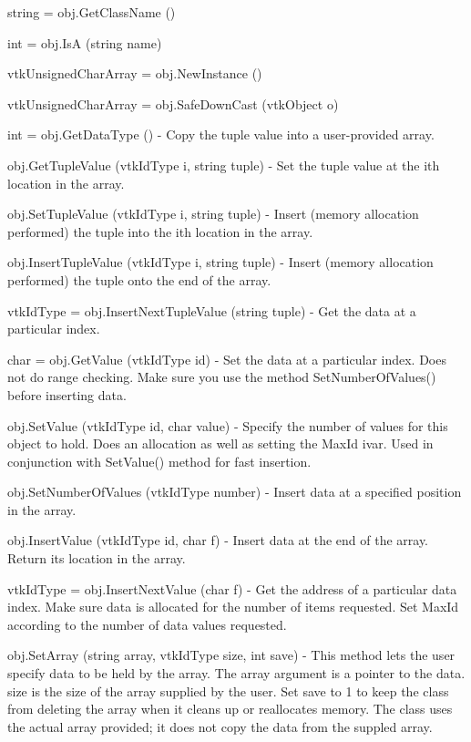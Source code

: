 \begin{DoxyItemize}
\item {\ttfamily string = obj.\-Get\-Class\-Name ()}  
\item {\ttfamily int = obj.\-Is\-A (string name)}  
\item {\ttfamily vtk\-Unsigned\-Char\-Array = obj.\-New\-Instance ()}  
\item {\ttfamily vtk\-Unsigned\-Char\-Array = obj.\-Safe\-Down\-Cast (vtk\-Object o)}  
\item {\ttfamily int = obj.\-Get\-Data\-Type ()} -\/ Copy the tuple value into a user-\/provided array.  
\item {\ttfamily obj.\-Get\-Tuple\-Value (vtk\-Id\-Type i, string tuple)} -\/ Set the tuple value at the ith location in the array.  
\item {\ttfamily obj.\-Set\-Tuple\-Value (vtk\-Id\-Type i, string tuple)} -\/ Insert (memory allocation performed) the tuple into the ith location in the array.  
\item {\ttfamily obj.\-Insert\-Tuple\-Value (vtk\-Id\-Type i, string tuple)} -\/ Insert (memory allocation performed) the tuple onto the end of the array.  
\item {\ttfamily vtk\-Id\-Type = obj.\-Insert\-Next\-Tuple\-Value (string tuple)} -\/ Get the data at a particular index.  
\item {\ttfamily char = obj.\-Get\-Value (vtk\-Id\-Type id)} -\/ Set the data at a particular index. Does not do range checking. Make sure you use the method Set\-Number\-Of\-Values() before inserting data.  
\item {\ttfamily obj.\-Set\-Value (vtk\-Id\-Type id, char value)} -\/ Specify the number of values for this object to hold. Does an allocation as well as setting the Max\-Id ivar. Used in conjunction with Set\-Value() method for fast insertion.  
\item {\ttfamily obj.\-Set\-Number\-Of\-Values (vtk\-Id\-Type number)} -\/ Insert data at a specified position in the array.  
\item {\ttfamily obj.\-Insert\-Value (vtk\-Id\-Type id, char f)} -\/ Insert data at the end of the array. Return its location in the array.  
\item {\ttfamily vtk\-Id\-Type = obj.\-Insert\-Next\-Value (char f)} -\/ Get the address of a particular data index. Make sure data is allocated for the number of items requested. Set Max\-Id according to the number of data values requested.  
\item {\ttfamily obj.\-Set\-Array (string array, vtk\-Id\-Type size, int save)} -\/ This method lets the user specify data to be held by the array. The array argument is a pointer to the data. size is the size of the array supplied by the user. Set save to 1 to keep the class from deleting the array when it cleans up or reallocates memory. The class uses the actual array provided; it does not copy the data from the suppled array.  

\end{DoxyItemize}
